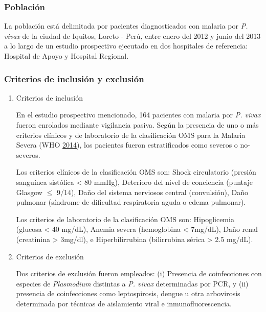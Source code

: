 \documentclass[
  a4paper]{article}
\begin{document}
\hypertarget{poblaciuxf3n}{%
\subsubsection{Población}\label{poblaciuxf3n}}

La población está delimitada por pacientes diagnosticados con malaria
por \emph{P. vivax} de la ciudad de Iquitos, Loreto - Perú, entre enero
del 2012 y junio del 2013 a lo largo de un estudio prospectivo ejecutado
en dos hospitales de referencia: Hospital de Apoyo y Hospital Regional.

\hypertarget{criterios-de-inclusiuxf3n-y-exclusiuxf3n}{%
\subsubsection{Criterios de inclusión y
exclusión}\label{criterios-de-inclusiuxf3n-y-exclusiuxf3n}}

\begin{enumerate}
\def\labelenumi{\alph{enumi}.}
\item
  Criterios de inclusión

  En el estudio prospectivo mencionado, 164 pacientes con malaria por
  \emph{P. vivax} fueron enrolados mediante vigilancia pasiva. Según la
  presencia de uno o más criterios clínicos y de laboratorio de la
  clasificación OMS para la Malaria Severa (WHO
  \protect\hyperlink{ref-WHO2014severe}{2014}), los pacientes fueron
  estratificados como severos o no-severos.

  Los criterios clínicos de la clasificación OMS son: Shock circulatorio
  (presión sanguínea sistólica \textless{} 80 mmHg), Deterioro del nivel
  de conciencia (puntaje Glasgow \(\le\) 9/14), Daño del sistema
  nerviosos central (convulsión), Daño pulmonar (síndrome de dificultad
  respiratoria aguda o edema pulmonar).

  Los criterios de laboratorio de la clasificación OMS son: Hipoglicemia
  (glucosa \textless{} 40 mg/dL), Anemia severa (hemoglobina \textless{}
  7mg/dL), Daño renal (creatinina \textgreater{} 3mg/dl), e
  Hiperbilirrubina (bilirrubina sérica \textgreater{} 2.5 mg/dL). 
\item
  Criterios de exclusión

  Dos criterios de exclusión fueron empleados: (i) Presencia de
  coinfecciones con especies de \emph{Plasmodium} distintas a \emph{P.
  vivax} determinadas por PCR, y (ii) presencia de coinfecciones como
  leptospirosis, dengue u otra arbovirosis determinada por técnicas de
  aislamiento viral e inmunofluorescencia. 
\end{enumerate}
\end{document}
